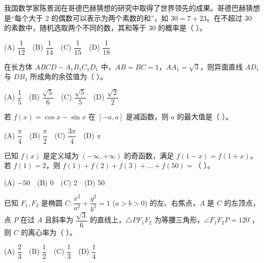 \begin{question}
我国数学家陈景润在哥德巴赫猜想的研究中取得了世界领先的成果。哥德巴赫猜想是“每个大于 2 的偶数可以表示为两个素数的和”，如 $30=7+23$。在不超过 30 的素数中，随机选取两个不同的数，其和等于 30 的概率是（ ）。

(A) $\dfrac{1}{12}$　(B) $\dfrac{1}{14}$　(C) $\dfrac{1}{15}$　(D) $\dfrac{1}{18}$

\end{question}
\begin{question}
在长方体 $ABCD-A_1B_1C_1D_1$ 中，$AB=BC=1$，$AA_1=\sqrt3$，则异面直线 $AD_1$ 与 $DB_1$ 所成角的余弦值为（ ）。

(A) $\dfrac15$　(B) $\dfrac{\sqrt5}{6}$　(C) $\dfrac{\sqrt5}{5}$　(D) $\dfrac{\sqrt2}{2}$

\end{question}
\begin{question}
若 $f(x)=\cos x-\sin x$ 在 $[-a,a]$ 是减函数，则 $a$ 的最大值是（ ）。

(A) $\dfrac\pi4$　(B) $\dfrac\pi2$　(C) $\dfrac{3\pi}{4}$　(D) $\pi$

\end{question}
\begin{question}
已知 $f(x)$ 是定义域为 $(-\infty,+\infty)$ 的奇函数，满足 $f(1-x)=f(1+x)$。若 $f(1)=2$，则 $f(1)+f(2)+f(3)+\dots+f(50)=$（ ）。

(A) $-50$　(B) 0　(C) 2　(D) 50

\end{question}
\begin{question}
已知 $F_1, F_2$ 是椭圆 $C: \dfrac{x^2}{a^2}+\dfrac{y^2}{b^2}=1$ ($a>b>0$) 的左、右焦点，$A$ 是 $C$ 的左顶点，点 $P$ 在过 $A$ 且斜率为 $\dfrac{\sqrt3}{6}$ 的直线上，$\triangle PF_1F_2$ 为等腰三角形，$\angle F_1F_2P = 120^\circ$，则 $C$ 的离心率为（ ）。

(A) $\dfrac23$　(B) $\dfrac12$　(C) $\dfrac13$　(D) $\dfrac14$

\par\medskip

\end{question}

